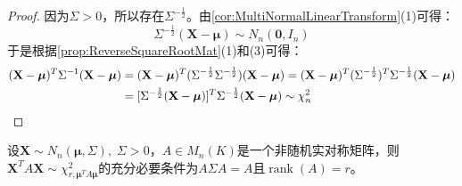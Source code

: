 \begin{proof}
	因为$\Sigma>0$，所以存在$\Sigma^{-\frac{1}{2}}$。由\cref{cor:MultiNormalLinearTransform}(1)可得：
	\begin{equation*}
		\Sigma^{-\frac{1}{2}}(\mathbf{X}-\boldsymbol{\mu})\sim N_n(\mathbf{0},I_n)
	\end{equation*}
	于是根据\cref{prop:ReverseSquareRootMat}(1)和(3)可得：
	\begin{align*}
		(\mathbf{X}-\boldsymbol{\mu})^T\Sigma^{-1}(\mathbf{X}-\boldsymbol{\mu})&=(\mathbf{X}-\boldsymbol{\mu})^T(\Sigma^{-\frac{1}{2}}\Sigma^{-\frac{1}{2}})(\mathbf{X}-\boldsymbol{\mu}) =(\mathbf{X}-\boldsymbol{\mu})^T(\Sigma^{-\frac{1}{2}})^T\Sigma^{-\frac{1}{2}}(\mathbf{X}-\boldsymbol{\mu}) \\
		&=[\Sigma^{-\frac{1}{2}}(\mathbf{X}-\boldsymbol{\mu})]^T\Sigma^{-\frac{1}{2}}(\mathbf{X}-\boldsymbol{\mu})\sim\chi_n^2\qedhere
	\end{align*}
\end{proof}
\begin{theorem}\label{theo:XAXChi2}
	设$\mathbf{X}\sim N_n(\boldsymbol{\mu},\Sigma),\;\Sigma>0$，$A\in M_{n}(K)$是一个非随机实对称矩阵，则$\mathbf{X}^TA\mathbf{X}\sim\chi_{r,\boldsymbol{\mu}^TA\boldsymbol{\mu}}^2$的充分必要条件为$A\Sigma A=A$且$\operatorname{rank}(A)=r$。
\end{theorem}
